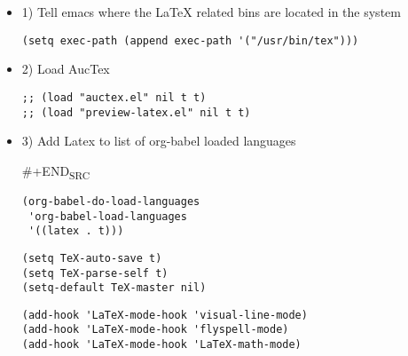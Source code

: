 \documentclass[11pt]{article}
\begin{document}
\begin{itemize}
\item 1) Tell emacs where the \LaTeX{} related bins are located in the system
\label{sec:org4748a72}

\begin{verbatim}
(setq exec-path (append exec-path '("/usr/bin/tex")))
\end{verbatim}

\item 2) Load AucTex
\label{sec:org87df796}

\begin{verbatim}
;; (load "auctex.el" nil t t)
;; (load "preview-latex.el" nil t t)
\end{verbatim}

\item 3) Add Latex to list of org-babel loaded languages
\label{sec:org48748ed}

\#+END\textsubscript{SRC}
\begin{verbatim}
(org-babel-do-load-languages
 'org-babel-load-languages
 '((latex . t)))
\end{verbatim}

\begin{verbatim}
(setq TeX-auto-save t)
(setq TeX-parse-self t)
(setq-default TeX-master nil)
\end{verbatim}


\begin{verbatim}
(add-hook 'LaTeX-mode-hook 'visual-line-mode)
(add-hook 'LaTeX-mode-hook 'flyspell-mode)
(add-hook 'LaTeX-mode-hook 'LaTeX-math-mode)   
\end{verbatim}
\end{itemize}
\end{document}
